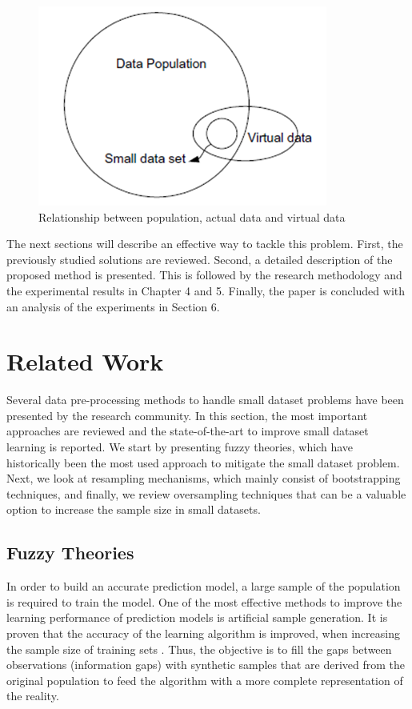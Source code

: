 \documentclass[parskip=full]{scrartcl}
\begin{document}
\begin{figure}[H]
	\centering
	\includegraphics[width=0.35\linewidth]{./resources/relationship}
	\caption{Relationship between population, actual data and virtual data \cite{Li.2006}}
	\label{fig:relationship}
\end{figure}

The next sections will describe an effective way to tackle this problem. First, 
the previously studied solutions are reviewed. Second, a detailed description 
of the proposed method is presented. This is followed by the research 
methodology and the experimental results in Chapter 4 and 5. Finally, the paper 
is concluded with an analysis of the experiments in Section 6.

\section{Related Work}
Several data pre-processing methods to handle small dataset problems have been
presented by the research community. In this section, the most important
approaches are reviewed and the state-of-the-art to improve small dataset
learning is reported. We start by presenting fuzzy theories, which have 
historically been the most used approach to mitigate the small dataset problem. 
Next, we look at resampling mechanisms, which mainly consist of bootstrapping 
techniques, and finally, we review oversampling techniques that can be a 
valuable option to increase the sample size in small datasets.

\subsection{Fuzzy Theories}

In order to build an accurate prediction model, a large sample of the 
population is required to train the model. One of the most effective methods to 
improve the learning performance of prediction models is artificial sample 
generation. It is proven that the accuracy of the learning algorithm is 
improved, when increasing the sample size of training sets 
\cite{AbdulLateh.2017}. Thus, the objective is to fill the gaps between 
observations (information gaps) with synthetic samples that are derived from 
the original population to feed the algorithm with a more complete 
representation of the reality.
\end{document}
